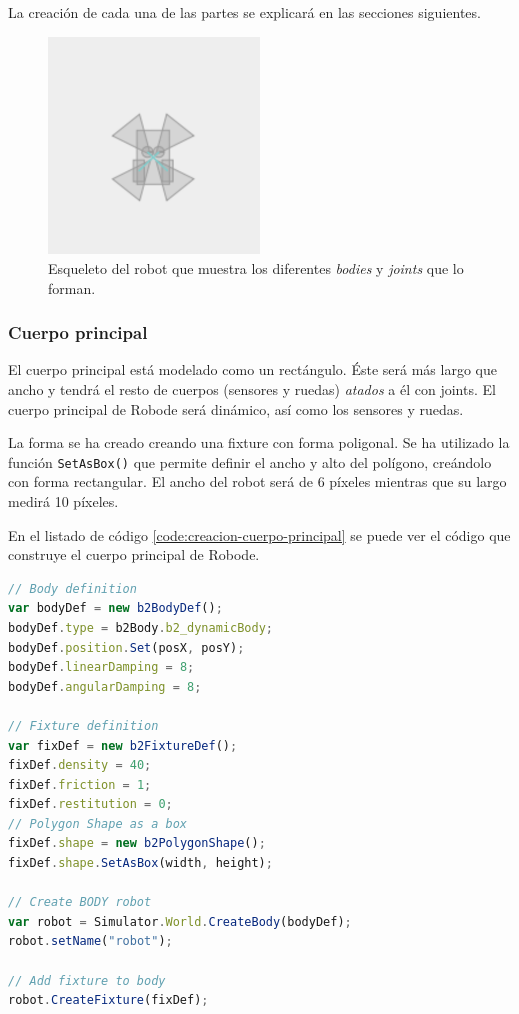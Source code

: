 La creación de cada una de las partes se explicará en las secciones siguientes.

\begin{figure}[!ht]
	\begin{centering}
		\includegraphics[width=0.5\textwidth]{images/robot-skel.png}
			\caption{Esqueleto del robot que muestra los diferentes \emph{bodies} y \emph{joints} que lo forman.}
				\label{fig:robot-skel}
	\end{centering}
\end{figure}


\subsubsection*{Cuerpo principal}
\label{sec:cuerpo-principal}

El cuerpo principal está modelado como un rectángulo. Éste será más largo que ancho y tendrá el resto de cuerpos (sensores y ruedas) \emph{atados} a él con joints. El cuerpo principal de Robode será dinámico, así como los sensores y ruedas.

La forma se ha creado creando una fixture con forma poligonal. Se ha utilizado la función \texttt{SetAsBox()} que permite definir el ancho y alto del polígono, creándolo con forma rectangular. El ancho del robot será de 6 píxeles mientras que su largo medirá 10 píxeles.

En el listado de código \ref{code:creacion-cuerpo-principal} se puede ver el código que construye el cuerpo principal de Robode.

\begin{lstlisting}[language={Javascript},label={code:creacion-cuerpo-principal}, caption={Creación del cuerpo principal del robot utilizando la librería Box2dweb.}]
// Body definition
var bodyDef = new b2BodyDef(); 
bodyDef.type = b2Body.b2_dynamicBody;
bodyDef.position.Set(posX, posY);
bodyDef.linearDamping = 8;
bodyDef.angularDamping = 8;

// Fixture definition
var fixDef = new b2FixtureDef(); 
fixDef.density = 40;
fixDef.friction = 1;
fixDef.restitution = 0;
// Polygon Shape as a box
fixDef.shape = new b2PolygonShape(); 
fixDef.shape.SetAsBox(width, height);

// Create BODY robot
var robot = Simulator.World.CreateBody(bodyDef);
robot.setName("robot");

// Add fixture to body
robot.CreateFixture(fixDef);
\end{lstlisting}


